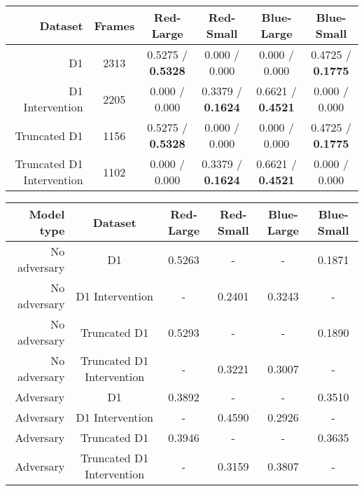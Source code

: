 \documentclass{article}
\begin{document}
\begin{table*} %
\centering
\begin{tabular}{r | c | c | c | c | c}
 Dataset & Frames & Red-Large & Red-Small & Blue-Large & Blue-Small \\
 \hline
 D1 & 2313 & 0.5275 / \textbf{0.5328} & 0.000 / 0.000 & 0.000 / 0.000 & 0.4725 / \textbf{0.1775} \\
 D1 Intervention & 2205 & 0.000 / 0.000 & 0.3379 / \textbf{0.1624} & 0.6621 / \textbf{0.4521} & 0.000 / 0.000 \\
 Truncated D1 & 1156 & 0.5275 / \textbf{0.5328} & 0.000 / 0.000 & 0.000 / 0.000 & 0.4725 / \textbf{0.1775} \\ 
 Truncated D1 Intervention & 1102 & 0.000 / 0.000 & 0.3379 / \textbf{0.1624} & 0.6621 / \textbf{0.4521} & 0.000 / 0.000 \\
\end{tabular}
\caption{Dataset Info. Proportion of total data points (Pong frames) in category / Proportion of points in category belonging to winning games.}
\label{tab:dataset_proportions}
\end{table*}

\begin{table*} %
\centering
\begin{tabular}{r | c | c | c | c | c}
 Model type & Dataset & Red-Large & Red-Small & Blue-Large & Blue-Small \\
 \hline
No adversary & D1 & 0.5263 & - & - & 0.1871 \\
No adversary  & D1 Intervention & - & 0.2401 & 0.3243 & - \\
No adversary  & Truncated D1 & 0.5293 & - & - & 0.1890 \\
No adversary  & Truncated D1 Intervention & - & 0.3221 & 0.3007 & - \\
\hline
Adversary & D1 & 0.3892 & - & - & 0.3510 \\
Adversary  & D1 Intervention & - & 0.4590 & 0.2926 & - \\
Adversary  & Truncated D1 & 0.3946 & - & - & 0.3635 \\
Adversary  & Truncated D1 Intervention & - & 0.3159 & 0.3807 & -
\end{tabular}
\caption{Predicted winning probabilities learned by each model on each dataset, in each category. Dashes occur where there are zero data points in the given category. Compare with the bolded numbers in Table \ref{tab:dataset_proportions}.}
\label{tab:model_performance}
\end{table*}
\end{document}
